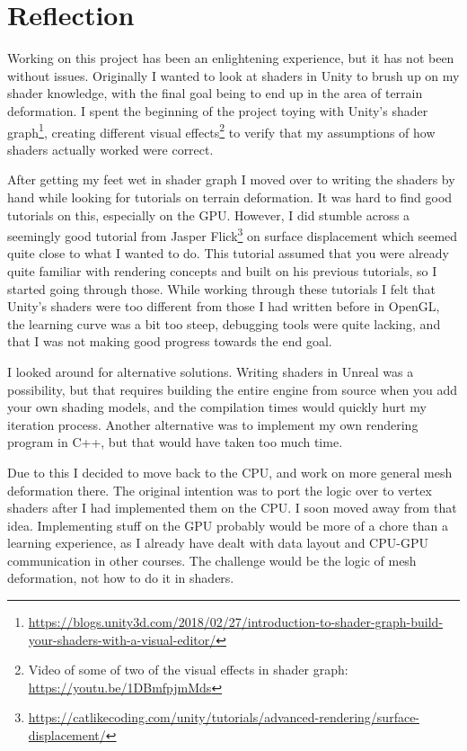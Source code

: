 \chapter{Reflection}
Working on this project has been an enlightening experience, but it has not been without issues.
Originally I wanted to look at shaders in Unity to brush up on my shader knowledge, with the final goal being to end up in the area of terrain deformation.
I spent the beginning of the project toying with Unity's shader graph\footnote{\url{https://blogs.unity3d.com/2018/02/27/introduction-to-shader-graph-build-your-shaders-with-a-visual-editor/}}, creating different visual effects\footnote{Video of some of two of the visual effects in shader graph: \url{https://youtu.be/1DBmfpjmMds}} to verify that my assumptions of how shaders actually worked were correct. 

After getting my feet wet in shader graph I moved over to writing the shaders by hand while looking for tutorials on terrain deformation.
It was hard to find good tutorials on this, especially on the GPU. However, I did stumble across a seemingly good tutorial from Jasper Flick\footnote{\url{https://catlikecoding.com/unity/tutorials/advanced-rendering/surface-displacement/}} 
on surface displacement which seemed quite close to what I wanted to do.
This tutorial assumed that you were already quite familiar with rendering concepts and built on his previous tutorials, so I started going through those.
While working through these tutorials I felt that Unity's shaders were too different from those I had written before in OpenGL, the learning curve
was a bit too steep, debugging tools were quite lacking, and that I was not making good progress towards the end goal.

I looked around for alternative solutions. Writing shaders in Unreal was a possibility, but that requires building the entire engine from source
when you add your own shading models\cite{unreal_shaders}, and the compilation times would quickly hurt my iteration process.
Another alternative was to implement my own rendering program in C++, but that would have taken too much time.

Due to this I decided to move back to the CPU, and work on more general mesh deformation there.
The original intention was to port the logic over to vertex shaders after I had implemented them on the CPU.
I soon moved away from that idea. Implementing stuff on the GPU probably would be more of a chore than a learning experience,
as I already have dealt with data layout and CPU-GPU communication in other courses.
The challenge would be the logic of mesh deformation, not how to do it in shaders.

